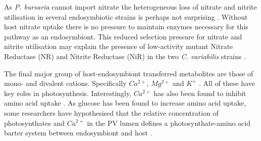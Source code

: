 %

As \textit{P. bursaria} cannot import nitrate \citep{Albers1982} the heterogeneous
loss of nitrate and nitrite utilisation in several endosymbiotic strains 
is perhaps not surprising \citep{Kato2009a}.
Without host nitrate uptake there is no pressure to maintain enzymes 
necessary for this pathway as an endosymbiont.
This reduced selection pressure for nitrate and nitrite utilisation 
may explain the presence of low-activity mutant Nitrate Reductase (NR) and Nitrite
Reductase (NiR) in the two \textit{C. variabilis} strains \citep{Kato2009a}. 


%

The final major group of host-endosymbiont transferred metabolites
are those of mono- and divalent cations.  Specifically
\(Ca^{2+}\), \(Mg^{2+}\) and \(K^{+}\) \citep{Kato2009a}.  All of 
these have key roles in photosynthesis.
Interestingly, \(Ca^{2+}\) has also been found to inhibit amino acid uptake \citep{Kato2008}.
As glucose has been found to increase amino acid uptake, some researchers
have hypothesised that the relative concentration of photosynthates
and \(Ca^{2+}\) in the PV lumen defines a photosynthate-amino acid
barter system between endosymbiont and host \citep{Kato2009a}.

